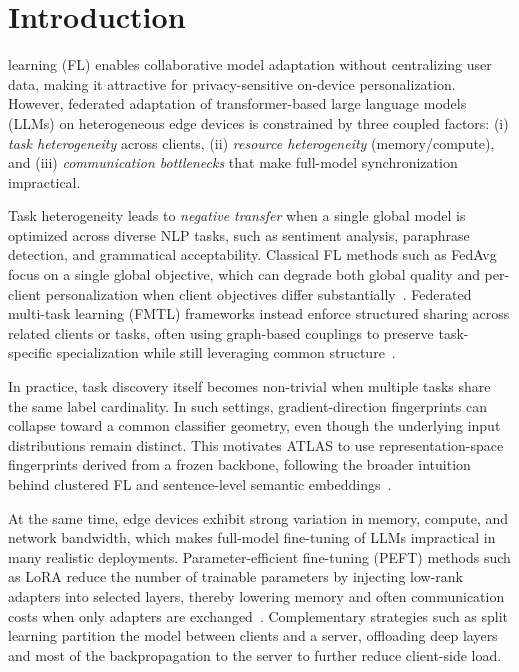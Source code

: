 \documentclass[conference]{IEEEtran}
\begin{document}
\section{Introduction}

 learning (FL) enables collaborative model adaptation without centralizing user data, making it attractive for privacy-sensitive on-device personalization. However, federated adaptation of transformer-based large language models (LLMs) on heterogeneous edge devices is constrained by three coupled factors: (i) \emph{task heterogeneity} across clients, (ii) \emph{resource heterogeneity} (memory/compute), and (iii) \emph{communication bottlenecks} that make full-model synchronization impractical.

Task heterogeneity leads to \emph{negative transfer} when a single global model is optimized across diverse NLP tasks, such as sentiment analysis, paraphrase detection, and grammatical acceptability. Classical FL methods such as FedAvg focus on a single global objective, which can degrade both global quality and per-client personalization when client objectives differ substantially~\cite{fedavg}. Federated multi-task learning (FMTL) frameworks instead enforce structured sharing across related clients or tasks, often using graph-based couplings to preserve task-specific specialization while still leveraging common structure~\cite{mira}.

In practice, task discovery itself becomes non-trivial when multiple tasks share the same label cardinality. In such settings, gradient-direction fingerprints can collapse toward a common classifier geometry, even though the underlying input distributions remain distinct. This motivates ATLAS to use representation-space fingerprints derived from a frozen backbone, following the broader intuition behind clustered FL and sentence-level semantic embeddings~\cite{cfl,ifca,sbert}.

At the same time, edge devices exhibit strong variation in memory, compute, and network bandwidth, which makes full-model fine-tuning of LLMs impractical in many realistic deployments. Parameter-efficient fine-tuning (PEFT) methods such as LoRA reduce the number of trainable parameters by injecting low-rank adapters into selected layers, thereby lowering memory and often communication costs when only adapters are exchanged~\cite{lora}. Complementary strategies such as split learning partition the model between clients and a server, offloading deep layers and most of the backpropagation to the server to further reduce client-side load.
\end{document}
